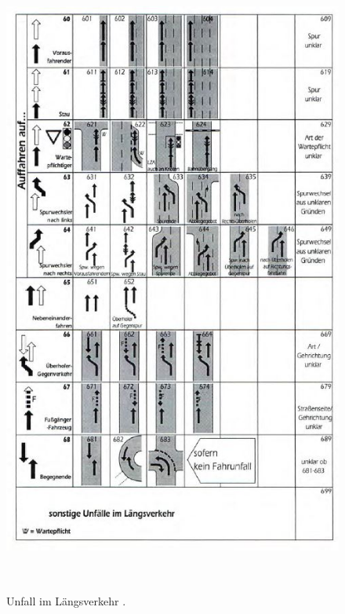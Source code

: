 \begin{savenotes}
	\begin{figure}[H]
		\centering
		\includegraphics[width=13cm,height=21cm]{figures/FT6}
		\caption[Unfall im Längsverkehr nach GDV]{Unfall im Längsverkehr \parencite[S. 19]{GesamtverbandderDeutschenVersicherungswirtschafte.V..2016}. }\label{fig:FT6}
	\end{figure}
\end{savenotes}

